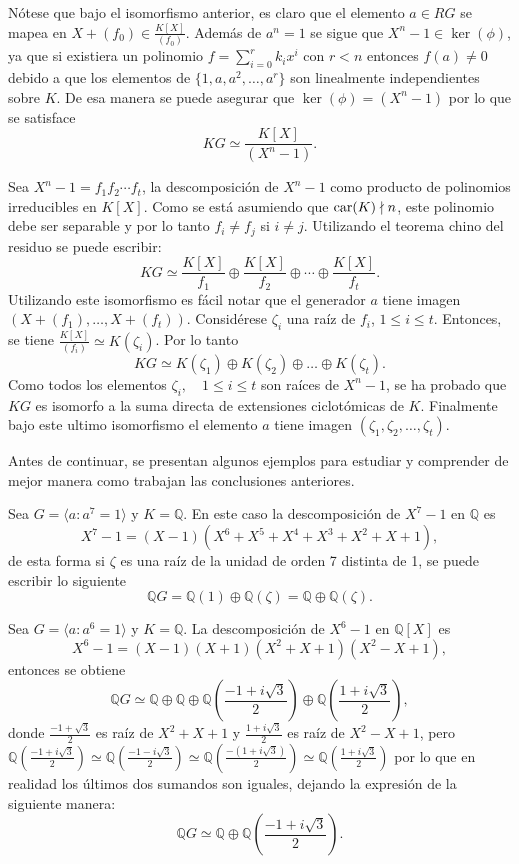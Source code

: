 Nótese que bajo el isomorfismo anterior, es claro que el elemento $a \in RG$ se mapea en $X + (f_0) \in \frac{K[X]}{(f_0)}$. Además de $a^n = 1$ se sigue que $X^n -1 \in \ker(\phi)$, ya que si existiera un polinomio $f = \sum_{i=0}^{r}k_ix^i$ con $r < n$ entonces $f(a) \neq 0$ debido a que los elementos de $\{1,a,a^2, \dots, a^r \}$ son linealmente independientes sobre $K$. De esa manera se puede asegurar que $\ker(\phi) = (X^n -1)$ por lo que se satisface 
\[KG \simeq \frac{K[X]}{(X^n -1 )}. \]

Sea $ X^n -1 = f_1f_2\cdots f_t$, la descomposición de $X^n -1$ como producto de polinomios irreducibles en $K[X]$. Como se está asumiendo que $\operatorname{car}(K) \nmid n$, este polinomio debe ser separable y por lo tanto $f_i \neq f_j$ si $i \neq j$. Utilizando el teorema chino del residuo se puede escribir:
\[KG \simeq \frac{K[X]}{f_1} \oplus \frac{K[X]}{f_2} \oplus \cdots \oplus \frac{K[X]}{f_t}. \]
Utilizando este isomorfismo es fácil notar que el generador $a$ tiene imagen $( X + (f_1)  , \dots, X + (f_t) ) $. 
Considérese $\zeta_i$ una raíz de $f_i$, $1 \leq i \leq t$. Entonces, se tiene $\frac{K[X]}{(f_i)} \simeq K(\zeta_i)$. Por lo tanto
\[ KG \simeq K(\zeta_1) \oplus K(\zeta_2) \oplus \dots \oplus K(\zeta_t). \]
Como todos los elementos $\zeta_i , \quad 1 \leq i \leq t$ son raíces de $X^n -1$, se ha probado que $KG$ es isomorfo a la suma directa de extensiones ciclotómicas de $K$. Finalmente bajo este 
ultimo isomorfismo el elemento $a$ tiene imagen $(\zeta_1 , \zeta_2, \dots ,\zeta_t)$.

Antes de continuar, se presentan algunos ejemplos para estudiar y comprender de mejor manera como trabajan las conclusiones anteriores.
\begin{ejemplo}\label{ejem:orden7}
Sea $G = \langle a \colon a^7 = 1 \rangle$ y $K = \mathds{Q} $. 
En este caso la descomposición de $ X^7 -1$ en $\mathds{Q}$ es 
\[ X^7 -1 = (X-1)(X^6 + X^5 + X^4 + X^3 + X^2 + X + 1), \]
de esta forma si $\zeta$ es una raíz de la unidad de orden 7 distinta de 1, se puede escribir lo siguiente
\[  \mathds{Q}G = \mathds{Q}(1) \oplus \mathds{Q}(\zeta) = \mathds{Q} \oplus \mathds{Q}(\zeta).   \]
\end{ejemplo}
\begin{ejemplo}
Sea $G = \langle a: a^6 = 1 \rangle$ y $K = \mathds{Q}$. La descomposición de $X^6 - 1 $ en \nopagebreak[0] $\mathds{Q}[X]$ es 
\[ X^6 - 1 = (X-1)(X+1)(X^2 + X + 1)(X^2-X+1), \]
entonces se obtiene 
\[  \mathds{Q}G \simeq \mathds{Q} \oplus \mathds{Q} \oplus \mathds{Q}\left( \frac{-1+i\sqrt{3}}{2} \right) \oplus \mathds{Q}\left( \frac{1+i\sqrt{3}}{2} \right),\]
donde $\frac{-1 + \sqrt{3}}{2}$ es raíz de $X^2+X+1$ y $\frac{1+i\sqrt{3}}{2}$ es raíz de $X^2-X+1$, pero $\mathds{Q}\left( \frac{-1+i\sqrt{3}}{2} \right) \simeq \mathds{Q}\left( \frac{-1-i\sqrt{3}}{2} \right) \simeq \mathds{Q}\left( \frac{-(1+i\sqrt{3})}{2} \right) \simeq \mathds{Q}\left( \frac{1+i\sqrt{3}}{2} \right)$
por lo que en realidad los últimos dos sumandos son iguales, dejando la expresión de la siguiente manera:
\[  \mathds{Q}G \simeq  \mathds{Q} \oplus \mathds{Q}\left( \frac{-1+i\sqrt{3}}{2} \right).   \]
\end{ejemplo}

